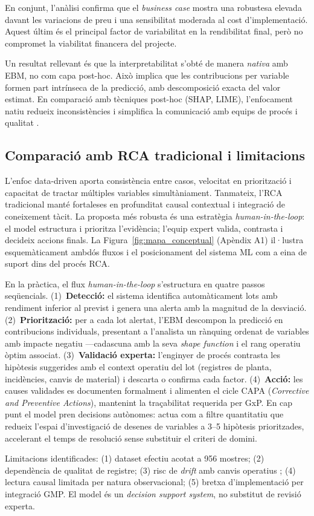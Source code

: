 En conjunt, l'anàlisi confirma que el \emph{business case} mostra una robustesa elevada davant les variacions de preu i una sensibilitat moderada al cost d'implementació. Aquest últim és el principal factor de variabilitat en la rendibilitat final, però no compromet la viabilitat financera del projecte.

Un resultat rellevant és que la interpretabilitat s'obté de manera \emph{nativa} amb EBM, no com capa post-hoc. Això implica que les contribucions per variable formen part intrínseca de la predicció, amb descomposició exacta del valor estimat. En comparació amb tècniques post-hoc (SHAP, LIME), l'enfocament natiu redueix inconsistències i simplifica la comunicació amb equips de procés i qualitat \cite{shap_arxiv1705,lime_arxiv1602,rudin2021fundamental}.

\subsection{Comparació amb RCA tradicional i limitacions}

L'enfoc data-driven aporta consistència entre casos, velocitat en priorització i capacitat de tractar múltiples variables simultàniament. Tanmateix, l'RCA tradicional manté fortaleses en profunditat causal contextual i integració de coneixement tàcit. La proposta més robusta és una estratègia \emph{human-in-the-loop}: el model estructura i prioritza l'evidència; l'equip expert valida, contrasta i decideix accions finals. La Figura~\ref{fig:mapa_conceptual} (Apèndix A1) il·lustra esquemàticament ambdós fluxos i el posicionament del sistema ML com a eina de suport dins del procés RCA.

En la pràctica, el flux \emph{human-in-the-loop} s'estructura en quatre passos seqüencials. (1)~\textbf{Detecció:} el sistema identifica automàticament lots amb rendiment inferior al previst i genera una alerta amb la magnitud de la desviació. (2)~\textbf{Priorització:} per a cada lot alertat, l'EBM descompon la predicció en contribucions individuals, presentant a l'analista un rànquing ordenat de variables amb impacte negatiu ---cadascuna amb la seva \emph{shape function} i el rang operatiu òptim associat. (3)~\textbf{Validació experta:} l'enginyer de procés contrasta les hipòtesis suggerides amb el context operatiu del lot (registres de planta, incidències, canvis de material) i descarta o confirma cada factor. (4)~\textbf{Acció:} les causes validades es documenten formalment i alimenten el cicle CAPA (\emph{Corrective and Preventive Actions}), mantenint la traçabilitat requerida per GxP. En cap punt el model pren decisions autònomes: actua com a filtre quantitatiu que redueix l'espai d'investigació de desenes de variables a 3--5 hipòtesis prioritzades, accelerant el temps de resolució sense substituir el criteri de domini.

Limitacions identificades: (1) dataset efectiu acotat a 956 mostres; (2) dependència de qualitat de registre; (3) risc de \emph{drift} amb canvis operatius \cite{lu2020drift}; (4) lectura causal limitada per natura observacional; (5) bretxa d'implementació per integració GMP. El model és un \emph{decision support system}, no substitut de revisió experta.
